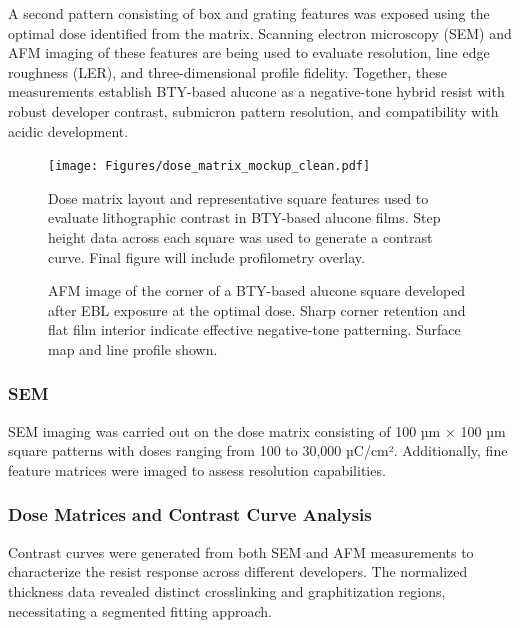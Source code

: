 A second pattern consisting of box and grating features was exposed using the optimal dose identified from the matrix. Scanning electron microscopy (SEM) and AFM imaging of these features are being used to evaluate resolution, line edge roughness (LER), and three-dimensional profile fidelity. Together, these measurements establish BTY-based alucone as a negative-tone hybrid resist with robust developer contrast, submicron pattern resolution, and compatibility with acidic development.

\begin{figure}[ht]
  \centering
  \texttt{[image: Figures/dose\_matrix\_mockup\_clean.pdf]}
  \caption{Dose matrix layout and representative square features used to evaluate lithographic contrast in BTY-based alucone films. Step height data across each square was used to generate a contrast curve. Final figure will include profilometry overlay.}
  \label{fig:contrast_curve_placeholder}
\end{figure}

\begin{figure}[ht]
  \centering
  \begin{center}
  \end{center}
  \caption{AFM image of the corner of a BTY-based alucone square developed after EBL exposure at the optimal dose. Sharp corner retention and flat film interior indicate effective negative-tone patterning. Surface map and line profile shown.}
  \label{fig:afm_corner_placeholder}
\end{figure}

\subsubsection{SEM}
SEM imaging was carried out on the dose matrix consisting of 100 µm × 100 µm square patterns with doses ranging from 100 to 30,000 µC/cm². Additionally, fine feature matrices were imaged to assess resolution capabilities.

\subsubsection{Dose Matrices and Contrast Curve Analysis}
Contrast curves were generated from both SEM and AFM measurements to characterize the resist response across different developers. The normalized thickness data revealed distinct crosslinking and graphitization regions, necessitating a segmented fitting approach.

